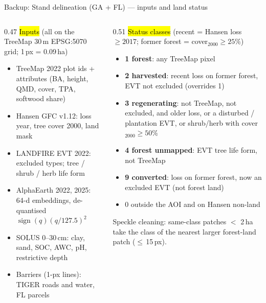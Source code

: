 


\begin{frame}{Backup: Stand delineation (GA + FL) — inputs and land status}
\footnotesize
\begin{columns}[T]
\begin{column}{0.47\textwidth}
\hl{Inputs} (all on the TreeMap 30\,m EPSG:5070 grid; 1\,px = 0.09\,ha)
\begin{itemize}\setlength\itemsep{1pt}
\item TreeMap 2022 plot ids + attributes (BA, height, QMD, cover, TPA, softwood share)
\item Hansen GFC v1.12: loss year, tree cover 2000, land mask
\item LANDFIRE EVT 2022: excluded types; tree / shrub / herb life form
\item AlphaEarth 2022, 2025: 64-d embeddings, de-quantised $\operatorname{sign}(q)(q/127.5)^2$
\item SOLUS 0–30\,cm: clay, sand, SOC, AWC, pH, restrictive depth
\item Barriers (1-px lines): TIGER roads and water, FL parcels
\end{itemize}
\end{column}
\begin{column}{0.51\textwidth}
\hl{Status classes} (recent = Hansen loss $\ge 2017$; former forest = cover$_{2000}\ge 25\%$)
\begin{itemize}\setlength\itemsep{1pt}
\item \textbf{1 forest}: any TreeMap pixel
\item \textbf{2 harvested}: recent loss on former forest, EVT not excluded (overrides 1)
\item \textbf{3 regenerating}: not TreeMap, not excluded, and older loss, or a disturbed / plantation EVT, or shrub/herb with cover$_{2000}\ge 50\%$
\item \textbf{4 forest unmapped}: EVT tree life form, not TreeMap
\item \textbf{9 converted}: loss on former forest, now an excluded EVT (not forest land)
\item 0 outside the AOI and on Hansen non-land
\end{itemize}
Speckle cleaning: same-class patches $<$ 2\,ha take the class of the nearest larger forest-land patch ($\le$\,15\,px).
\end{column}
\end{columns}
\end{frame}

